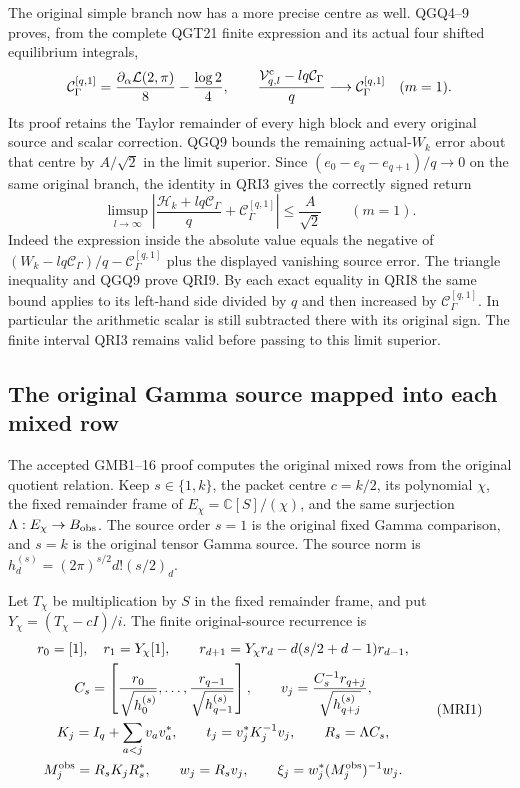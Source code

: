 \documentclass[11pt,a4paper]{article}
\begin{document}
The original simple branch now has a more precise centre as well.
QGQ4--9 proves, from the complete QGT21 finite expression and its
actual four shifted equilibrium integrals,
\[
 \mathcal C_\Gamma^{[q,1]}
       =\frac{\partial_\alpha\mathcal L(2,\pi)}8
                            -\frac{\log2}{4},\qquad
 \frac{\mathcal V^{\rm c}_{q,l}-lq\mathcal C_\Gamma}{q}
                            \longrightarrow\mathcal C_\Gamma^{[q,1]}
 \quad(m=1).
\]
Its proof retains the Taylor remainder of every high block and
every original source and scalar correction. QGQ9 bounds the
remaining actual-$W_k$ error about that centre by $A/\sqrt2$
in the limit superior. Since
$(e_0-e_q-e_{q+1})/q\to0$ on the same original branch, the
identity in QRI3 gives the correctly signed return
\[
 \boxed{\displaystyle
 \limsup_{l\to\infty}
 \left|\frac{\mathcal H_k+lq\mathcal C_\Gamma}{q}
                         +\mathcal C_\Gamma^{[q,1]}\right|
                \le\frac A{\sqrt2}\qquad(m=1).}
 \tag{QRI9}
\]
Indeed the expression inside the absolute value equals the
negative of
$(W_k-lq\mathcal C_\Gamma)/q-\mathcal C_\Gamma^{[q,1]}$
plus the displayed vanishing source error. The triangle inequality
and QGQ9 prove QRI9. By each exact equality in QRI8 the same bound
applies to its left-hand side divided by $q$ and then increased
by $\mathcal C_\Gamma^{[q,1]}$. In particular the arithmetic scalar
is still subtracted there with its original sign. The finite
interval QRI3 remains valid before passing to this limit superior.

\subsection{The original Gamma source mapped into each mixed row}

The accepted GMB1--16 proof computes the original mixed rows from
the original quotient relation. Keep $s\in\{1,k\}$, the packet
centre $c=k/2$, its polynomial $\chi$, the fixed remainder frame
of $E_\chi=\mathbb C[S]/(\chi)$, and the same surjection
$\Lambda:E_\chi\to B_{\rm obs}$. The source order $s=1$ is
the original fixed Gamma comparison, and $s=k$ is the original
tensor Gamma source. The source norm is
$h_d^{(s)}=(2\pi)^{s/2}d!(s/2)_d$.

Let $T_\chi$ be multiplication by $S$ in the fixed remainder
frame, and put $Y_\chi=(T_\chi-cI)/i$. The finite original-source
recurrence is
\[
\begin{gathered}
 r_0=[1],\quad r_1=Y_\chi[1],\qquad
 r_{d+1}=Y_\chi r_d-d(s/2+d-1)r_{d-1},\\
 C_s=\left[\frac{r_0}{\sqrt{h_0^{(s)}}},\ldots,
          \frac{r_{q-1}}{\sqrt{h_{q-1}^{(s)}}}\right],\qquad
 v_j=\frac{C_s^{-1}r_{q+j}}{\sqrt{h_{q+j}^{(s)}}},\\
 K_j=I_q+\sum_{a<j}v_av_a^*,\qquad
 t_j=v_j^*K_j^{-1}v_j,\qquad R_s=\Lambda C_s,\\
 M_j^{\rm obs}=R_sK_jR_s^*,\qquad
 w_j=R_sv_j,\qquad
 \xi_j=w_j^*(M_j^{\rm obs})^{-1}w_j.
\end{gathered}\tag{MRI1}
\]
\end{document}
